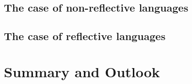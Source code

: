 \subsection{The case of non-reflective languages}

\subsection{The case of reflective languages}


\section{Summary and Outlook}



